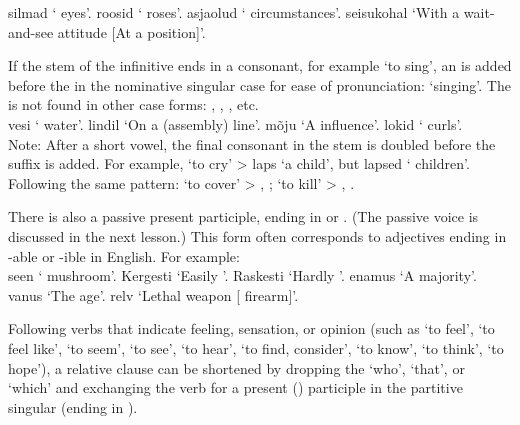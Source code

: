  silmad ` eyes'.  roosid ` roses'.  asjaolud ` circumstances'.  seisukohal `With a wait-and-see attitude [\lit At a  position]'.

\newSection \label{section-320} If the stem of the  infinitive ends in a consonant, for example  `to sing', an  is added before the  in the nominative singular case for ease of pronunciation:  `singing'. The  is not found in other case forms: \gen \sing {}, \parti \sing {}, \ill \sing {}, etc. \\

 vesi ` water'.  lindil `On a  (assembly) line'.  mõju `A  influence'.  lokid ` curls'. \\

Note: After a short vowel, the final consonant in the stem is doubled before the  suffix is added. For example,  `to cry' >  laps `a  child', but  lapsed ` children'. Following the same pattern:  `to cover' > , ;  `to kill' > , .

\newSection \label{section-321} There is also a passive present participle, ending in  or . (The passive voice is discussed in the next lesson.) This form often corresponds to adjectives ending in -able or -ible in English. For example: \\

 seen ` mushroom'. Kergesti  `Easily '. Raskesti  `Hardly '.  enamus `A  majority'.  vanus `The  age'.  relv `Lethal weapon [ firearm]'.


\newSection \label{section-322} Following verbs that indicate feeling, sensation, or opinion (such as  `to feel',  `to feel like',  `to seem',  `to see',  `to hear',  `to find, consider',  `to know',  `to think',  `to hope'), a relative clause can be shortened by dropping the `who', `that', or `which' and exchanging the verb for a present () participle in the partitive singular (ending in ). \\

